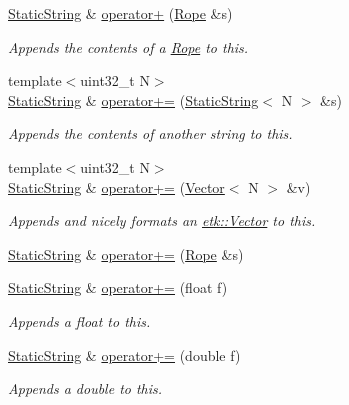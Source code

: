 \begin{DoxyCompactItemize}
\hyperlink{classetk_1_1_static_string}{Static\-String} \& \hyperlink{classetk_1_1_static_string_a4360f55c0003eac4b2bfc4b536034df1}{operator+} (\hyperlink{classetk_1_1_rope}{Rope} \&s)
\begin{DoxyCompactList}\small\item\em Appends the contents of a \hyperlink{classetk_1_1_rope}{Rope} to this. \end{DoxyCompactList}\item 
{\footnotesize template$<$uint32\-\_\-t N$>$ }\\\hyperlink{classetk_1_1_static_string}{Static\-String} \& \hyperlink{classetk_1_1_static_string_abb7639e5db2fadf0f75c11279d56c012}{operator+=} (\hyperlink{classetk_1_1_static_string}{Static\-String}$<$ N $>$ \&s)
\begin{DoxyCompactList}\small\item\em Appends the contents of another string to this. \end{DoxyCompactList}\item 
{\footnotesize template$<$uint32\-\_\-t N$>$ }\\\hyperlink{classetk_1_1_static_string}{Static\-String} \& \hyperlink{classetk_1_1_static_string_a5652d2ae09bac5f0f7dacb5d198f126d}{operator+=} (\hyperlink{classetk_1_1_vector}{Vector}$<$ N $>$ \&v)
\begin{DoxyCompactList}\small\item\em Appends and nicely formats an \hyperlink{classetk_1_1_vector}{etk\-::\-Vector} to this. \end{DoxyCompactList}\item 
\hyperlink{classetk_1_1_static_string}{Static\-String} \& \hyperlink{classetk_1_1_static_string_a4989ff63067111d9febd227619417c2d}{operator+=} (\hyperlink{classetk_1_1_rope}{Rope} \&s)
\item 
\hyperlink{classetk_1_1_static_string}{Static\-String} \& \hyperlink{classetk_1_1_static_string_af554e70798b8deee951fa22d3b73c08f}{operator+=} (float f)
\begin{DoxyCompactList}\small\item\em Appends a float to this. \end{DoxyCompactList}\item 
\hyperlink{classetk_1_1_static_string}{Static\-String} \& \hyperlink{classetk_1_1_static_string_aa40e2bed504c072623e6a656b3dc2cf8}{operator+=} (double f)
\begin{DoxyCompactList}\small\item\em Appends a double to this. \end{DoxyCompactList}\item 

\end{DoxyCompactItemize}
